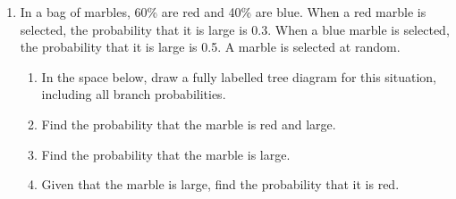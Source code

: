 \documentclass[12pt, twoside]{article}
\begin{document}
\begin{enumerate}[itemsep=0.1cm]
\newpage
\item In a bag of marbles, 60\% are red and 40\% are blue. When a red marble is
selected, the probability that it is large is 0.3. When a blue marble is selected,
the probability that it is large is 0.5. A marble is selected at random.
\begin{enumerate}[itemsep=2.5cm]
    \item In the space below, draw a fully labelled tree diagram for this situation,
    including all branch probabilities.

    \vspace{6cm}

    \item Find the probability that the marble is red and large.
    \item Find the probability that the marble is large.
    \item Given that the marble is large, find the probability that it is red.
\end{enumerate}

\end{enumerate}
\end{document}
